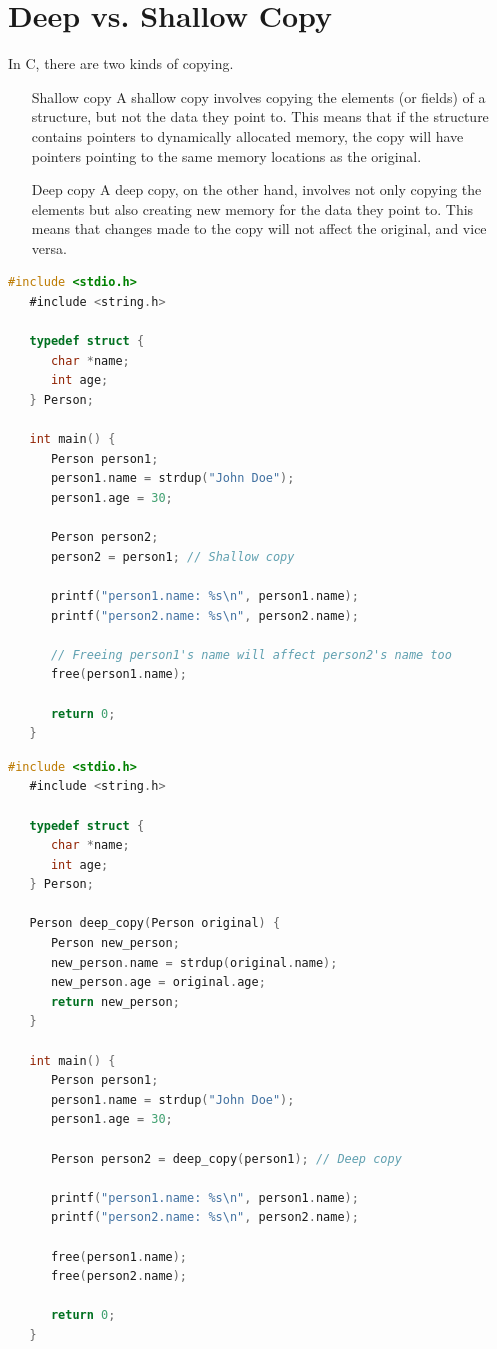 \documentclass[nobib]{tufte-handout}
\begin{document}
\section{Deep vs. Shallow Copy}

In C, there are two kinds of copying. 
\begin{itemize}
   \item[Shallow copy] A shallow copy involves copying the elements 
   (or fields) of a structure, but not the data they point to. 
   This means that if the structure contains pointers to dynamically 
   allocated memory, the copy will have pointers pointing to the same 
   memory locations as the original.
   \item[Deep copy] A deep copy, on the other hand, involves not only 
   copying the elements but also creating new memory for the data they 
   point to. This means that changes made to the copy will not affect 
   the original, and vice versa.
\end{itemize}

\begin{lstlisting}[language=C, caption=Shallow copy]
   #include <stdio.h>
   #include <string.h>

   typedef struct {
      char *name;
      int age;
   } Person;

   int main() {
      Person person1;
      person1.name = strdup("John Doe");
      person1.age = 30;

      Person person2;
      person2 = person1; // Shallow copy

      printf("person1.name: %s\n", person1.name);
      printf("person2.name: %s\n", person2.name);

      // Freeing person1's name will affect person2's name too
      free(person1.name);

      return 0;
   }
\end{lstlisting}

\begin{lstlisting}[language=C, caption=Deep copy]
   #include <stdio.h>
   #include <string.h>

   typedef struct {
      char *name;
      int age;
   } Person;

   Person deep_copy(Person original) {
      Person new_person;
      new_person.name = strdup(original.name);
      new_person.age = original.age;
      return new_person;
   }

   int main() {
      Person person1;
      person1.name = strdup("John Doe");
      person1.age = 30;

      Person person2 = deep_copy(person1); // Deep copy

      printf("person1.name: %s\n", person1.name);
      printf("person2.name: %s\n", person2.name);

      free(person1.name);
      free(person2.name);

      return 0;
   }

\end{lstlisting}
\end{document}
